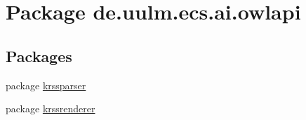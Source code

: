 \hypertarget{namespacede_1_1uulm_1_1ecs_1_1ai_1_1owlapi}{\section{Package de.\-uulm.\-ecs.\-ai.\-owlapi}
\label{namespacede_1_1uulm_1_1ecs_1_1ai_1_1owlapi}
}
\subsection*{Packages}
\begin{DoxyCompactItemize}
\item 
package \hyperlink{namespacede_1_1uulm_1_1ecs_1_1ai_1_1owlapi_1_1krssparser}{krssparser}
\item 
package \hyperlink{namespacede_1_1uulm_1_1ecs_1_1ai_1_1owlapi_1_1krssrenderer}{krssrenderer}
\end{DoxyCompactItemize}
